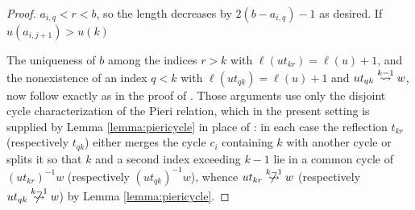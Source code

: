 \documentclass{amsart}
\theoremstyle{definition}
\theoremstyle{remark}
\numberwithin{equation}{section}
\newcommand{\xrightsquigarrow}[2][]{%
	\mathrel{\mathop{\rightsquigarrow}\limits^{\scriptstyle #2}%
	\ifx\hfuzz#1\hfuzz\else_{\scriptstyle #1}\fi}%
}
\newcommand{\tom}[1]{\ensuremath{\xrightsquigarrow{#1}}}
\begin{document}
\begin{proof}


$a_{i,q}<r<b$, so the length decreases by $2(b-a_{i,q})-1$ as desired. If $u(a_{i,j+1})>u(k)$



The uniqueness of $b$ among the indices $r>k$ with $\ell(ut_{kr})=\ell(u)+1$, and the nonexistence of an index $q<k$ with $\ell(ut_{qk})=\ell(u)+1$ and $ut_{qk}\tom{k-1}w$, now follow exactly as in the proof of \cite[Lemma~7.6]{samuelmolev}. Those arguments use only the disjoint cycle characterization of the Pieri relation, which in the present setting is supplied by Lemma \ref{lemma:piericycle} in place of \cite[Lemma~7.3]{samuelmolev}: in each case the reflection $t_{kr}$ (respectively $t_{qk}$) either merges the cycle $c_i$ containing $k$ with another cycle or splits it so that $k$ and a second index exceeding $k-1$ lie in a common cycle of $(ut_{kr})^{-1}w$ (respectively $(ut_{qk})^{-1}w$), whence $ut_{kr}\ntom{k-1}w$ (respectively $ut_{qk}\ntom{k-1}w$) by Lemma \ref{lemma:piericycle}.
\end{proof}
\end{document}
